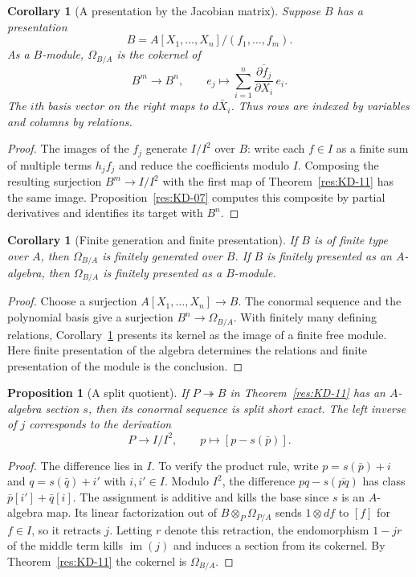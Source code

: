 \documentclass[11pt,oneside,openany]{book}
\newtheorem{proposition}[theorem]{Proposition}
\newtheorem{corollary}[theorem]{Corollary}
\theoremstyle{definition}
\theoremstyle{remark}
\begin{document}
\begin{corollary}[A presentation by the Jacobian matrix]\label{res:KD-12}
Suppose $B$ has a presentation
\[
 B=A[X_1,\ldots,X_n]/(f_1,\ldots,f_m).
\]
As a $B$-module, $\Omega_{B/A}$ is the cokernel of
\[
 B^m\longrightarrow B^n,\qquad
 e_j\longmapsto \sum_{i=1}^n\overline{\frac{\partial f_j}{\partial X_i}}\,e_i .
\]
The $i$th basis vector on the right maps to $d\bar X_i$. Thus rows are indexed by variables and columns by relations.
\end{corollary}

\begin{proof}
The images of the $f_j$ generate $I/I^2$ over $B$: write each $f\in I$ as a finite sum of multiple terms $h_j f_j$ and reduce the coefficients modulo $I$. Composing the resulting surjection $B^m\to I/I^2$ with the first map of Theorem~\ref{res:KD-11} has the same image. Proposition~\ref{res:KD-07} computes this composite by partial derivatives and identifies its target with $B^n$.
\end{proof}

\begin{corollary}[Finite generation and finite presentation]\label{res:KD-13}
If $B$ is of finite type over $A$, then $\Omega_{B/A}$ is finitely generated over $B$. If $B$ is finitely presented as an $A$-algebra, then $\Omega_{B/A}$ is finitely presented as a $B$-module.
\end{corollary}

\begin{proof}
Choose a surjection $A[X_1,\ldots,X_n]\to B$. The conormal sequence and the polynomial basis give a surjection $B^n\to\Omega_{B/A}$. With finitely many defining relations, Corollary~\ref{res:KD-12} presents its kernel as the image of a finite free module. Here finite presentation of the algebra determines the relations and finite presentation of the module is the conclusion.
\end{proof}

\begin{proposition}[A split quotient]\label{res:KD-14}
If $P\twoheadrightarrow B$ in Theorem~\ref{res:KD-11} has an $A$-algebra section $s$, then its conormal sequence is split short exact. The left inverse of $j$ corresponds to the derivation
\[
 P\longrightarrow I/I^2,\qquad p\longmapsto[p-s(\bar p)] .
\]
\end{proposition}

\begin{proof}
The difference lies in $I$. To verify the product rule, write $p=s(\bar p)+i$ and $q=s(\bar q)+i'$ with $i,i'\in I$. Modulo $I^2$, the difference $pq-s(\overline{pq})$ has class $\bar p[i']+\bar q[i]$. The assignment is additive and kills the base since $s$ is an $A$-algebra map. Its linear factorization out of $B\otimes_P\Omega_{P/A}$ sends $1\otimes df$ to $[f]$ for $f\in I$, so it retracts $j$. Letting $r$ denote this retraction, the endomorphism $1-jr$ of the middle term kills $\operatorname{im}(j)$ and induces a section from its cokernel. By Theorem~\ref{res:KD-11} the cokernel is $\Omega_{B/A}$.
\end{proof}
\end{document}
